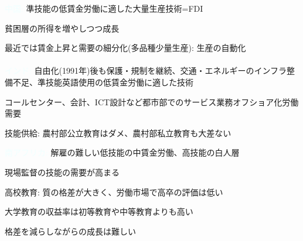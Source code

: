 \begin{frame}{}
\textcolor{azure}{中国:} 準技能の低賃金労働に適した大量生産技術=FDI
\begin{dinglist}{43}
\vspace{1.0ex}\setlength{\itemsep}{1.0ex}\setlength{\baselineskip}{12pt}
\pause
\item	貧困層の所得を増やしつつ成長
\end{dinglist}
\vspace{1ex}
\pause
最近では賃金上昇と需要の細分化(多品種少量生産): 生産の自動化\\~\\
\pause
\textcolor{azure}{インド:} 自由化(1991年)後も保護・規制を継続、交通・エネルギーのインフラ整備不足、準技能英語使用の低賃金労働に適した技術
\begin{dinglist}{43}
\vspace{1.0ex}\setlength{\itemsep}{1.0ex}\setlength{\baselineskip}{12pt}
\pause
\item	コールセンター、会計、ICT設計など都市部でのサービス業務オフショア化労働需要
\pause
\item	技能供給: 農村部公立教育はダメ、農村部私立教育も大差ない
\end{dinglist}
\vspace{2ex}
\pause
\textcolor{azure}{南アフリカ:} 解雇の難しい低技能の中賃金労働、高技能の白人層
\begin{dinglist}{43}
\vspace{1.0ex}\setlength{\itemsep}{1.0ex}\setlength{\baselineskip}{12pt}
\pause
\item	現場監督の技能の需要が高まる
\pause
\item	高校教育: 質の格差が大きく、労働市場で高卒の評価は低い
\pause
\item	大学教育の収益率は初等教育や中等教育よりも高い
\pause
\item	格差を減らしながらの成長は難しい
\end{dinglist}
\end{frame}

